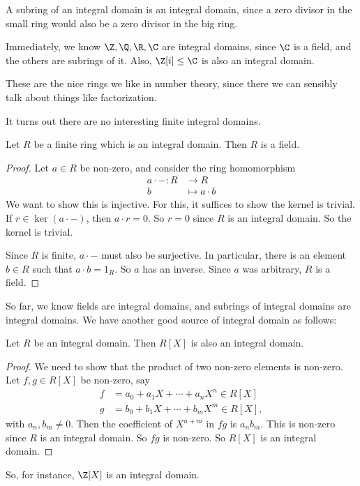 \documentclass[a4paper]{article}
\begin{document}
\begin{eg}
  A subring of an integral domain is an integral domain, since a zero divisor in the small ring would also be a zero divisor in the big ring.
\end{eg}

\begin{eg}
  Immediately, we know $\Z, \Q, \R, \C$ are integral domains, since $\C$ is a field, and the others are subrings of it. Also, $\Z[i] \leq \C$ is also an integral domain.
\end{eg}
These are the nice rings we like in number theory, since there we can sensibly talk about things like factorization.

It turns out there are no interesting finite integral domains.
\begin{lemma}
  Let $R$ be a finite ring which is an integral domain. Then $R$ is a field.
\end{lemma}

\begin{proof}
  Let $a \in R$ be non-zero, and consider the ring homomorphism
  \begin{align*}
    a \cdot -: R &\to R\\
    b &\mapsto a \cdot b
  \end{align*}
  We want to show this is injective. For this, it suffices to show the kernel is trivial. If $r \in \ker (a \cdot -)$, then $a \cdot r = 0$. So $r = 0$ since $R$ is an integral domain. So the kernel is trivial.

  Since $R$ is finite, $a\cdot -$ must also be surjective. In particular, there is an element $b \in R$ such that $a \cdot b = 1_R$. So $a$ has an inverse. Since $a$ was arbitrary, $R$ is a field.
\end{proof}

So far, we know fields are integral domains, and subrings of integral domains are integral domains. We have another good source of integral domain as follows:
\begin{lemma}
  Let $R$ be an integral domain. Then $R[X]$ is also an integral domain.
\end{lemma}

\begin{proof}
  We need to show that the product of two non-zero elements is non-zero. Let $f, g\in R[X]$ be non-zero, say
  \begin{align*}
    f &= a_0 + a_1X + \cdots + a_n X^n \in R[X]\\
    g &= b_0 + b_1X + \cdots + b_m X^m \in R[X],
  \end{align*}
  with $a_n, b_m \not= 0$. Then the coefficient of $X^{n + m}$ in $fg$ is $a_n b_m$. This is non-zero since $R$ is an integral domain. So $fg$ is non-zero. So $R[X]$ is an integral domain.
\end{proof}
So, for instance, $\Z[X]$ is an integral domain.
\end{document}

